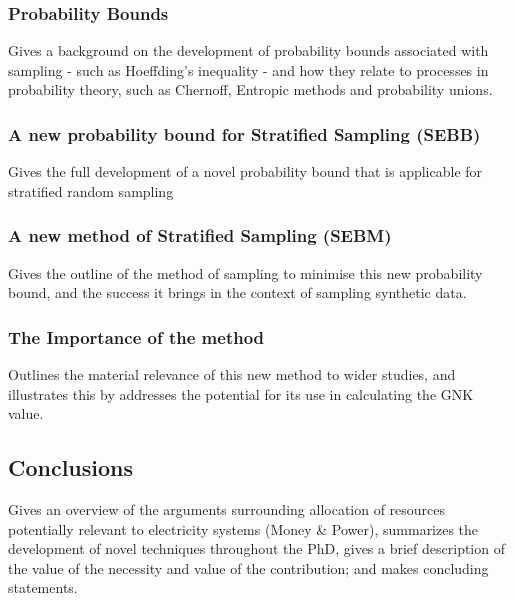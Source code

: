 \documentclass{article}
\begin{document}
\subsubsection{Probability Bounds}
Gives a background on the development of probability bounds associated with sampling - such as Hoeffding's inequality - and how they relate to processes in probability theory, such as Chernoff, Entropic methods and probability unions.

\subsubsection{A new probability bound for Stratified Sampling (SEBB)}
Gives the full development of a novel probability bound that is applicable for stratified random sampling

\subsubsection{A new method of Stratified Sampling (SEBM)}
Gives the outline of the method of sampling to minimise this new probability bound, and the success it brings in the context of sampling synthetic data.

\subsubsection{The Importance of the method}
Outlines the material relevance of this new method to wider studies, and illustrates this by addresses the potential for its use in calculating the GNK value.

\subsection{Conclusions}
Gives an overview of the arguments surrounding allocation of resources potentially relevant to electricity systems (Money \& Power), summarizes the development of novel techniques throughout the PhD, gives a brief description of the value of the necessity and value of the contribution; and makes concluding statements.










\end{document}
